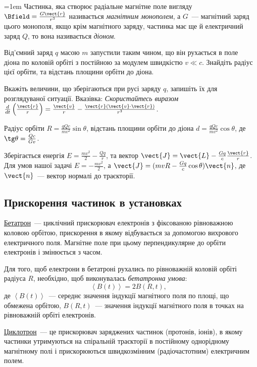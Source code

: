 \begin{problem}
\parindent=1em%
    Частинка, яка створює радіальне магнітне поле вигляду $\Bfield = \frac{G\vect{r}}{r^3}$ називається \emph{магнітним монополем}, а $G$~--- магнітний заряд цього монополя, якщо крім магнітного заряду,  частинка має ще й електричний заряд $Q$, то вона називається \emph{діоном}.

	Від'ємний заряд $q$ масою $m$ запустили таким чином, що він рухається в поле діона по коловій орбіті з постійною за модулем швидкістю $v \ll c$. Знайдіть радіус цієї орбіти, та відстань площини орбіти до діона.
	
	Вкажіть величини, що зберігаються при русі заряду $q$, запишіть їх для розглядуваної ситуації. Вказівка: \emph{Скористайтесь виразом $\frac{d}{dt}\left( \frac{\vect{r}}{r}\right)  = \frac{\vect{v}}{r} - \frac{\vect{r}(\vect{v}\cdot\vect{r})}{r^3}$}.
\begin{solution}
	Радіус орбіти $R = \frac{qQc}{mv^2}\sin\theta$, відстань площини орбіти до діона $d = \frac{qQc}{mv^2}\cos\theta$, де $\tg\theta = \frac{Q c}{G v}$.

	Зберігається енергія $E = \frac{mv^2}{2} - \frac{Qq}{r}$, та вектор $\vect{J} = \vect{L} - \frac{Gq}{c}\frac{\vect{r}}{r} $. Для умов нашої задачі $E = -\frac{mv^2}{2}$, а $\vect{J} = (mvR - \frac{Gq}{c}\cos\theta) \vect{n} $, де $\vect{n}$~--- вектор нормалі до траєкторії.
\end{solution}
\end{problem}



\subsection*{Прискорення частинок в установках}

\begin{Theory}
\href{http://nuclphys.sinp.msu.ru/experiment/accelerators/betatron.htm}{Бетатрон}~--- циклічний  прискорювач електронів з фіксованою рівноважною коловою орбітою, прискорення в якому відбувається за допомогою вихрового електричного поля. Магнітне поле при цьому перпендикулярне до орбіти електронів і змінюється з часом.

Для того, щоб електрони в бетатроні рухались по рівноважній коловій орбіті радіуса $R$, необхідно, щоб виконувалась \emph{бетатронна умова}:
\begin{equation}\label{Betatron_equation}
	\left\langle B(t)\right\rangle  = 2 B(R,t),
\end{equation}
де $\left\langle B(t)\right\rangle$~--- середнє значення індукції магнітного поля по площі, що обмежена орбітою,  $B(R,t)$~--- значення індукції магнітного поля в точках на рівноважній орбіті електронів. 

\href{http://nuclphys.sinp.msu.ru/experiment/accelerators/ciclotron.htm}{Циклотрон}~--- це прискорювач заряджених частинок (протонів, іонів), в якому частинки  утримуються на спіральній траєкторії в постійному  однорідному магнітному полі і прискорюються швидкозмінним (радіочастотним) електричним полем.
\end{Theory}

